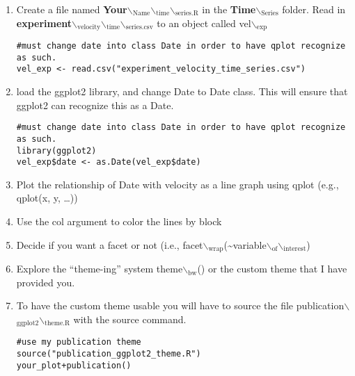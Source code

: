 \documentclass[11pt]{article}
\begin{document}
\begin{enumerate}
\item Create a file named \textbf{Your$\backslash$\(_{\text{Name}}\)$\backslash$\(_{\text{time}}\)$\backslash$\(_{\text{series.R}}\)} in the \textbf{Time$\backslash$\(_{\text{Series}}\)} folder. Read in \textbf{experiment$\backslash$\(_{\text{velocity}}\)$\backslash$\(_{\text{time}}\)$\backslash$\(_{\text{series.csv}}\)} to an object called vel$\backslash$\(_{\text{exp}}\)
\lstset{language=R,label= ,caption= ,captionpos=b,numbers=none}
\begin{lstlisting}
#must change date into class Date in order to have qplot recognize as such.
vel_exp <- read.csv("experiment_velocity_time_series.csv")
\end{lstlisting}

\item load the ggplot2 library, and change Date to Date class. This will ensure that ggplot2 can recognize this as a Date. 
\lstset{language=R,label= ,caption= ,captionpos=b,numbers=none}
\begin{lstlisting}
#must change date into class Date in order to have qplot recognize as such.
library(ggplot2)
vel_exp$date <- as.Date(vel_exp$date)
\end{lstlisting}

\item Plot the relationship of Date with velocity as a line graph using qplot (e.g., qplot(x, y, \ldots{}))

\item Use the col argument to color the lines by block

\item Decide if you want a facet or not (i.e., facet$\backslash$\(_{\text{wrap}}\)(\textasciitilde{}variable$\backslash$\(_{\text{of}}\)$\backslash$\(_{\text{interest}}\))

\item Explore the “theme-ing” system theme$\backslash$\(_{\text{bw}}\)() or the custom theme that I have provided you.

\item To have the custom theme usable you will have to source the file publication$\backslash$\(_{\text{ggplot2}}\)$\backslash$\(_{\text{theme.R}}\) with the source command.
\lstset{language=R,label= ,caption= ,captionpos=b,numbers=none}
\begin{lstlisting}
#use my publication theme
source("publication_ggplot2_theme.R")
your_plot+publication()
\end{lstlisting}


\end{enumerate}
\end{document}
